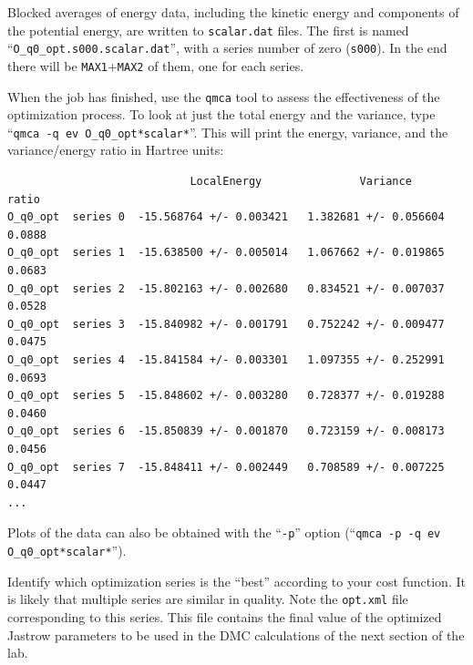 Blocked averages of energy data, including the kinetic energy and components of the potential energy, are written to \texttt{scalar.dat} files.  The first is named ``\texttt{O\_q0\_opt.s000.scalar.dat}'', with a series number of zero (\texttt{s000}).  In the end there will be \texttt{MAX1}+\texttt{MAX2} of them, one for each series. 

When the job has finished, use the \texttt{qmca} tool to assess the effectiveness of the optimization process.  To look at just the total energy and the variance, type ``\texttt{qmca -q ev O\_q0\_opt*scalar*}''.  This will print the energy, variance, and the variance/energy ratio in Hartree units:
\begin{shaded}
\begin{verbatim}
                            LocalEnergy               Variance           ratio 
O_q0_opt  series 0  -15.568764 +/- 0.003421   1.382681 +/- 0.056604   0.0888 
O_q0_opt  series 1  -15.638500 +/- 0.005014   1.067662 +/- 0.019865   0.0683 
O_q0_opt  series 2  -15.802163 +/- 0.002680   0.834521 +/- 0.007037   0.0528 
O_q0_opt  series 3  -15.840982 +/- 0.001791   0.752242 +/- 0.009477   0.0475 
O_q0_opt  series 4  -15.841584 +/- 0.003301   1.097355 +/- 0.252991   0.0693 
O_q0_opt  series 5  -15.848602 +/- 0.003280   0.728377 +/- 0.019288   0.0460 
O_q0_opt  series 6  -15.850839 +/- 0.001870   0.723159 +/- 0.008173   0.0456 
O_q0_opt  series 7  -15.848411 +/- 0.002449   0.708589 +/- 0.007225   0.0447 
...
\end{verbatim}
\end{shaded}
\noindent
Plots of the data can also be obtained with the ``\texttt{-p}'' option (``\texttt{qmca -p -q ev O\_q0\_opt*scalar*}'').

Identify which optimization series is the ``best'' according to your cost function.  It is likely that multiple series are similar in quality.  Note the \texttt{opt.xml} file corresponding to this series.  This file contains the final value of the optimized Jastrow parameters to be used in the DMC calculations of the next section of the lab.  

